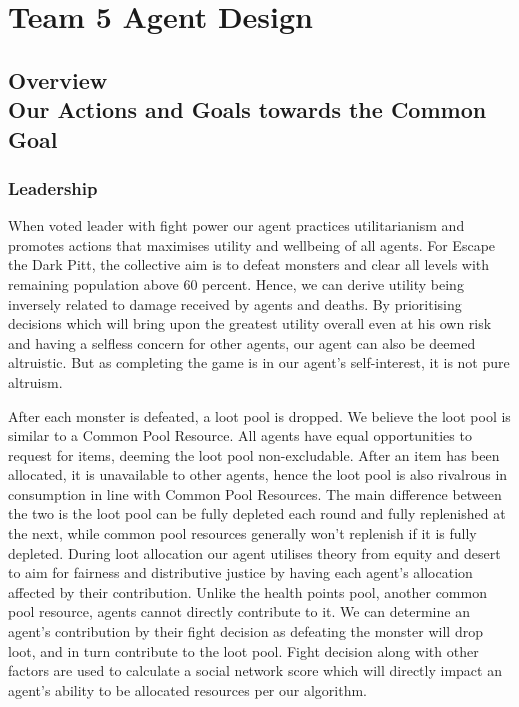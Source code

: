 \chapter{Team 5 Agent Design}\label{team_5_agent_design}

{\section[Overview]{Overview\\ {Our Actions and Goals towards the Common Goal}}}

\subsection{Leadership}
When voted leader with fight power our agent practices utilitarianism \cite{pitt} and promotes actions that maximises utility and wellbeing of all agents. For Escape the Dark Pitt, the collective aim is to defeat monsters and clear all levels with remaining population above 60 percent. Hence, we can derive utility being inversely related to damage received by agents and deaths. By prioritising decisions which will bring upon the greatest utility overall even at his own risk and having a selfless concern for other agents, our agent can also be deemed altruistic. But as completing the game is in our agent's self-interest, it is not pure altruism.

After each monster is defeated, a loot pool is dropped. We believe the loot pool is similar to a Common Pool Resource. All agents have equal opportunities to request for items, deeming the loot pool non-excludable. After an item has been allocated, it is unavailable to other agents, hence the loot pool is also rivalrous in consumption in line with Common Pool Resources. The main difference between the two is the loot pool can be fully depleted each round and fully replenished at the next, while common pool resources generally won't replenish if it is fully depleted. During loot allocation our agent utilises theory from equity and desert \cite{pitt} to aim for fairness and distributive justice by having each agent's allocation affected by their contribution. Unlike the health points pool, another common pool resource, agents cannot directly contribute to it. We can determine an agent's contribution by their fight decision as defeating the monster will drop loot, and in turn contribute to the loot pool. Fight decision along with other factors are used to calculate a social network score which will directly impact an agent's ability to be allocated resources per our algorithm.

